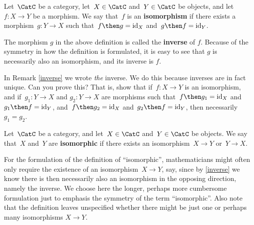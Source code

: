 
\begin{shaded*}
\begin{definition}[Isomorphism]
Let~$\CatC$ be a category, let~$X \in \CatC$ and~$Y \in \CatC$ be objects, and let~$f\colon X \to Y$ be a morphism. We say that~$f$ is an \textbf{isomorphism} if there exists a morphism~$g\colon Y \to X$ such that~$f \then g = \text{id}_X$ and~$g \then f = \text{id}_Y$.
\end{definition}
\end{shaded*}

\begin{remark}\label{inverse}
The morphism $g$ in the above definition is called the \textbf{inverse} of $f$. Because of the symmetry in how the definition is formulated, it is easy to see that $g$ is necessarily also an isomorphism, and its inverse is $f$.
\end{remark}

\begin{exercise}
In Remark \ref{inverse} we wrote \emph{the} inverse. We do this because inverses are in fact unique. Can you prove this?
That is, show that if~$f\colon X \to Y$ is an isomorphism, and if~$g_1\colon Y \to X$ and $g_2\colon Y \to X$ are morphisms such that~$f \then g_1 = \text{id}_X$ and~$g_1 \then f = \text{id}_Y$, and~$f \then g_2 = \text{id}_X$ and~$g_2 \then f = \text{id}_Y$, then necessarily~$g_1 = g_2$.
\end{exercise}

\begin{shaded*}
\begin{definition}[Isomorphic]
Let~$\CatC$ be a category, and let~$X \in \CatC$ and~$Y \in \CatC$ be objects. We say that~$X$ and~$Y$ are \textbf{isomorphic} if there exists an isomorphism~$X \to Y$ or~$Y \to X$.
\end{definition}
\end{shaded*}

For the formulation of the definition of ``isomorphic'', mathematicians might often only require the existence of an isomorphism~$X \to Y$, say, since by \cref{inverse} we know there is then necessarily also an isomorphism in the opposing direction, namely the inverse. We choose here the longer, perhaps more cumbersome formulation just to emphasis the symmetry of the term ``isomorphic''. Also note that the definition leaves unspecified whether there might be just one or perhaps many isomorphisms $X \to Y$.

